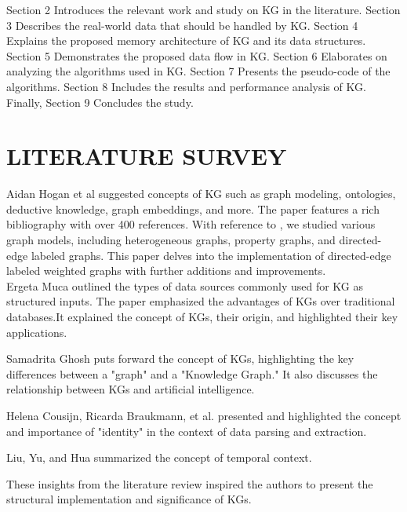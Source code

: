 \documentclass[conference]{IEEEtran}
\begin{document}
Section 2 Introduces the relevant work and study on KG in the literature. Section 3 Describes the real-world data that should be handled by KG. Section 4 Explains the proposed memory architecture of KG and its data structures. Section 5 Demonstrates the proposed data flow in KG. Section 6 Elaborates on analyzing the algorithms used in KG. Section 7 Presents the pseudo-code of the algorithms. Section 8 Includes the results and performance analysis of KG.
Finally, Section 9 Concludes the study.


\section{LITERATURE SURVEY}

Aidan Hogan et al\cite{b8} suggested concepts of KG such as graph modeling, ontologies, deductive knowledge, graph embeddings, and more. The paper features a rich bibliography with over 400 references.
With reference to \cite{b8}, we studied various graph models, including heterogeneous graphs\cite{b18}, property graphs\cite{b12}, and directed-edge labeled graphs\cite{b8}. This paper delves into the implementation of directed-edge labeled weighted graphs with further additions and improvements.
\\
Ergeta Muca\cite{b7} outlined the types of data sources commonly used for KG as structured inputs. The paper emphasized the advantages of KGs over traditional databases.It explained the concept of KGs, their origin, and highlighted their key applications.

Samadrita Ghosh \cite{b1} puts forward the concept of KGs, highlighting the key differences between a "graph" and a "Knowledge Graph." It also discusses the relationship between KGs and artificial intelligence.

Helena Cousijn, Ricarda Braukmann, et al. \cite{b16} presented and highlighted the concept and importance of "identity" in the context of data parsing and extraction.

Liu, Yu, and Hua \cite{b17} summarized the concept of temporal context.

These insights from the literature review inspired the authors to present the structural implementation and significance of KGs.
\end{document}
